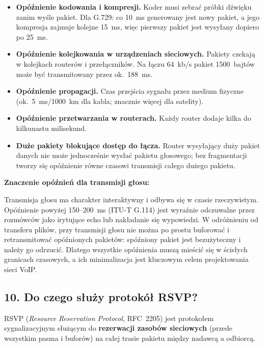 \documentclass[12pt,a4paper]{article}
\begin{document}
\begin{itemize}
  \item \textbf{Opóźnienie kodowania i kompresji.}
        Koder musi zebrać próbki dźwięku zanim wyśle pakiet. Dla G.729:
        co 10~ms generowany jest nowy pakiet, a jego kompresja zajmuje kolejne
        15~ms, więc pierwszy pakiet jest wysyłany dopiero po 25~ms.
  \item \textbf{Opóźnienie kolejkowania w urządzeniach sieciowych.}
        Pakiety czekają w kolejkach routerów i przełączników. Na łączu 64~kb/s
        pakiet 1500~bajtów może być transmitowany przez ok.\ 188~ms.
  \item \textbf{Opóźnienie propagacji.}
        Czas przejścia sygnału przez medium fizyczne (ok.\ 5~ms/1000~km dla
        kabla; znacznie więcej dla satelity).
  \item \textbf{Opóźnienie przetwarzania w routerach.}
        Każdy router dodaje kilka do kilkunastu milisekund.
  \item \textbf{Duże pakiety blokujące dostęp do łącza.}
        Router wysyłający duży pakiet danych nie może jednocześnie wysłać
        pakietu głosowego; bez fragmentacji tworzy się opóźnienie równe
        czasowi transmisji całego dużego pakietu.
\end{itemize}

\textbf{Znaczenie opóźnień dla transmisji głosu:}

Transmisja głosu ma charakter interaktywny i odbywa się w czasie rzeczywistym.
Opóźnienie powyżej 150--200~ms (ITU-T G.114) jest wyraźnie odczuwalne przez
rozmówców jako irytujące echo lub nakładanie się wypowiedzi. W odróżnieniu od
transferu plików, przy transmisji głosu nie można po prostu buforować i
retransmitować opóźnionych pakietów: spóźniony pakiet jest bezużyteczny
i należy go odrzucić. Dlatego wszystkie opóźnienia muszą mieścić się w ścisłych
granicach czasowych, a ich minimalizacja jest kluczowym celem projektowania
sieci VoIP.

\subsection*{10. Do czego służy protokół RSVP?}

RSVP (\emph{Resource Reservation Protocol}, RFC~2205) jest protokołem
sygnalizacyjnym służącym do \textbf{rezerwacji zasobów sieciowych} (przede
wszystkim pasma i buforów) na całej trasie pakietu między nadawcą a odbiorcą.
\end{document}
